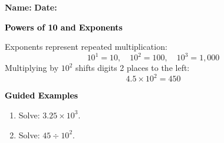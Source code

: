 \documentclass[12pt, letterpaper, fleqn]{article}
\begin{document}
\textbf{Name:} \underline{\hspace{5cm}}
\hfill
\textbf{Date:} \underline{\hspace{3cm}}\\

\begin{tcolorbox}[colback=customteal!20]
    \large\textcolor{black}{\textbf{Powers of 10 and Exponents}}
\end{tcolorbox}
\vspace{3mm}
Exponents represent repeated multiplication:
\[
10^1 = 10, \quad 10^2 = 100, \quad 10^3 = 1,000
\]
Multiplying by $10^2$ shifts digits 2 places to the left:
\[
4.5 \times 10^2 = 450
\]
\newpage
\begin{tcolorbox}[colback=customteal!20]
    \large\textcolor{black}{\textbf{Guided Examples}}
\end{tcolorbox}
\begin{enumerate}[itemsep=3.5cm, leftmargin=0.6cm]
\item Solve: $3.25 \times 10^3$.
\vspace{3cm}
\item Solve: $45 \div 10^2$.
\end{enumerate}
\end{document}
